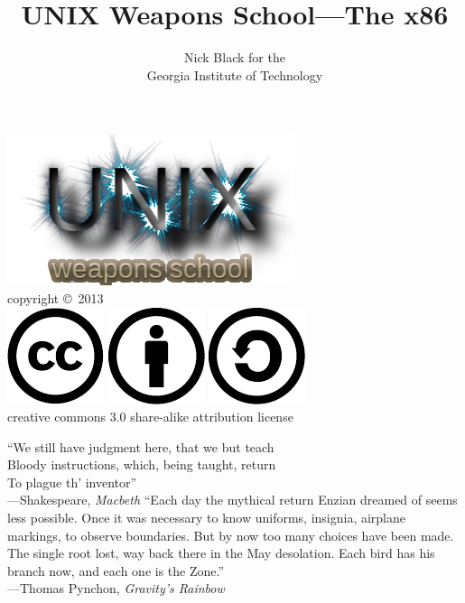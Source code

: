 \documentclass[mathserif,xcolor={dvipsnames,table}]{beamer}
\title{UNIX Weapons School---The x86}
\date{}
\author{Nick Black for the\\
Georgia Institute of Technology
}
\begin{document}
\begin{frame}
\titlepage
\begin{center}
\includegraphics[scale=0.33]{images/uws.png}\\
\vspace{.1in}
\tiny{copyright \copyright\ 2013}\\
\includegraphics[scale=.25]{images/cc-logo.pdf}
\includegraphics[scale=.25]{images/cc-new.pdf}
\includegraphics[scale=.25]{images/cc-share.pdf}\\
\tiny{creative commons 3.0 share-alike attribution license}
\end{center}
\end{frame}

\begin{frame}
``We still have judgment here, that we but teach\\
Bloody instructions, which, being taught, return\\
To plague th' inventor''\\
\hfill---Shakespeare, \textit{Macbeth}
\vfill
``Each day the mythical return Enzian dreamed of seems less possible. Once it
was necessary to know uniforms, insignia, airplane markings, to observe
boundaries. But by now too many choices have been made. The single root lost,
way back there in the May desolation. Each bird has his branch now, and each
one is the Zone.''\\
\hfill---Thomas Pynchon, \textit{Gravity's Rainbow}
\end{frame}
\end{document}
